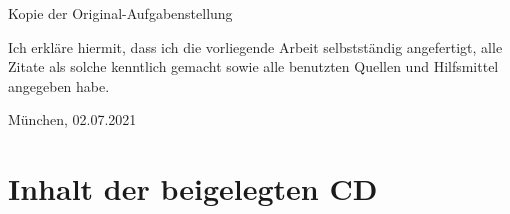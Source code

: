 \documentclass[11pt,a4paper,twoside]{article}
\begin{document}
Kopie der Original-Aufgabenstellung

\vfill %

\noindent Ich erkläre hiermit, dass ich die vorliegende Arbeit
selbstständig angefertigt, alle Zitate als solche kenntlich gemacht
sowie alle benutzten Quellen und Hilfsmittel angegeben habe.

\bigskip\noindent München, 02.07.2021

\vspace{4ex}\noindent\makebox[7cm]{\dotfill}


\cleardoublepage
\pagestyle{fancy}
\setcounter{page}{1}

\tableofcontents


\cleardoublepage

\setcounter{page}{1}
\fancyhead[LE,RO]{\rightmark}
\fancyhead[LO,RE]{\leftmark}
\fancyfoot[LE,RO]{\thepage}










\cleardoublepage
\fancyhead[LE,RO,LO,RE]{} %
\section*{Inhalt der beigelegten CD}

\cleardoublepage
\printbibliography
\end{document}

